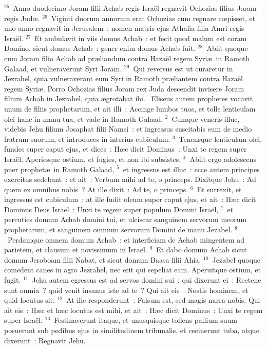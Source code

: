 ${}^{25}$~Anno duodecimo Joram filii Achab regis Isra\"el regnavit Ochozias filius Joram regis Jud\ae .
${}^{26}$~Viginti duorum annorum erat Ochozias cum regnare cœpisset, et uno anno regnavit in Jerusalem~: nomen matris ejus Athalia filia Amri regis Isra\"el.
${}^{27}$~Et ambulavit in viis domus Achab~: et fecit quod malum est coram Domino, sicut domus Achab~: gener enim domus Achab fuit.
${}^{28}$~Abiit quoque cum Joram filio Achab ad pr\ae liandum contra Haza\"el regem Syri\ae\ in Ramoth Galaad, et vulneraverunt Syri Joram.
${}^{29}$~Qui reversus est ut curaretur in Jezrahel, quia vulneraverant eum Syri in Ramoth pr\ae liantem contra Haza\"el regem Syri\ae . Porro Ochozias filius Joram rex Juda descendit invisere Joram filium Achab in Jezrahel, quia \ae grotabat ibi.
~\lettrine[lines=10,image=true,loversize=0.05,lraise=-0.03]{E}{}liseus autem prophetes vocavit unum de filiis prophetarum, et ait illi~: Accinge lumbos tuos, et tolle lenticulam olei hanc in manu tua, et vade in Ramoth Galaad.
${}^{2}$~Cumque veneris illuc, videbis Jehu filium Josaphat filii Namsi~: et ingressus suscitabis eum de medio fratrum suorum, et introduces in interius cubiculum.
${}^{3}$~Tenensque lenticulam olei, fundes super caput ejus, et dices~: H\ae c dicit Dominus~: Unxi te regem super Isra\"el. Aperiesque ostium, et fugies, et non ibi subsistes.
${}^{4}$~Abiit ergo adolescens puer prophet\ae\ in Ramoth Galaad,
${}^{5}$~et ingressus est illuc~: ecce autem principes exercitus sedebant~: et ait~: Verbum mihi ad te, o princeps. Dixitque Jehu~: Ad quem ex omnibus nobis~? At ille dixit~: Ad te, o princeps.
${}^{6}$~Et surrexit, et ingressus est cubiculum~: at ille fudit oleum super caput ejus, et ait~: H\ae c dicit Dominus Deus Isra\"el~: Unxi te regem super populum Domini Isra\"el,
${}^{7}$~et percuties domum Achab domini tui, et ulciscar sanguinem servorum meorum prophetarum, et sanguinem omnium servorum Domini de manu Jezabel.
${}^{8}$~Perdamque omnem domum Achab~: et interficiam de Achab mingentem ad parietem, et clausum et novissimum in Isra\"el.
${}^{9}$~Et dabo domum Achab sicut domum Jeroboam filii Nabat, et sicut domum Baasa filii Ahia.
${}^{10}$~Jezabel quoque comedent canes in agro Jezrahel, nec erit qui sepeliat eam. Aperuitque ostium, et fugit.
${}^{11}$~Jehu autem egressus est ad servos domini sui~: qui dixerunt ei~: Rectene sunt omnia~? quid venit insanus iste ad te~? Qui ait eis~: Nostis hominem, et quid locutus sit.
${}^{12}$~At ille responderunt~: Falsum est, sed magis narra nobis. Qui ait eis~: H\ae c et h\ae c locutus est mihi, et ait~: H\ae c dicit Dominus~: Unxi te regem super Isra\"el.
${}^{13}$~Festinaverunt itaque, et unusquisque tollens pallium suum posuerunt sub pedibus ejus in similitudinem tribunalis, et cecinerunt tuba, atque dixerunt~: Regnavit Jehu.


